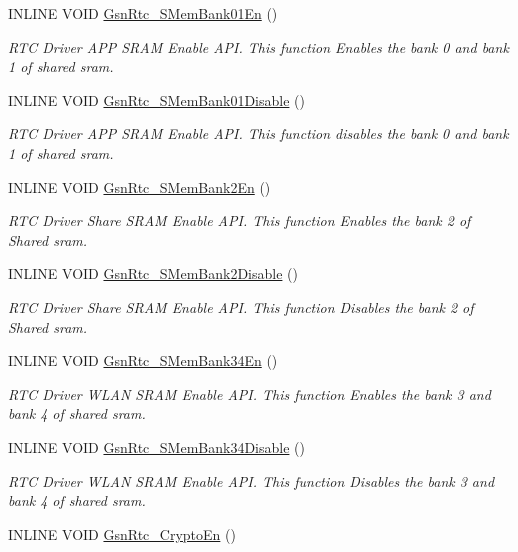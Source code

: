 \begin{DoxyCompactItemize}
\item 
INLINE VOID \hyperlink{a00651_ga6b4bcb149ee20725f2fc899a65d7fdf9}{GsnRtc\_\-SMemBank01En} ()
\begin{DoxyCompactList}\small\item\em RTC Driver APP SRAM Enable API. This function Enables the bank 0 and bank 1 of shared sram. \end{DoxyCompactList}\item 
INLINE VOID \hyperlink{a00651_ga7adb0e944f2c0f0dfffddd0afca63382}{GsnRtc\_\-SMemBank01Disable} ()
\begin{DoxyCompactList}\small\item\em RTC Driver APP SRAM Enable API. This function disables the bank 0 and bank 1 of shared sram. \end{DoxyCompactList}\item 
INLINE VOID \hyperlink{a00651_ga7540c91773261a93185b2bef4969277a}{GsnRtc\_\-SMemBank2En} ()
\begin{DoxyCompactList}\small\item\em RTC Driver Share SRAM Enable API. This function Enables the bank 2 of Shared sram. \end{DoxyCompactList}\item 
INLINE VOID \hyperlink{a00651_gae72a40c37c187ab506437b3592a59cf2}{GsnRtc\_\-SMemBank2Disable} ()
\begin{DoxyCompactList}\small\item\em RTC Driver Share SRAM Enable API. This function Disables the bank 2 of Shared sram. \end{DoxyCompactList}\item 
INLINE VOID \hyperlink{a00651_ga7b62ca77d978a7abc09284be65ea845e}{GsnRtc\_\-SMemBank34En} ()
\begin{DoxyCompactList}\small\item\em RTC Driver WLAN SRAM Enable API. This function Enables the bank 3 and bank 4 of shared sram. \end{DoxyCompactList}\item 
INLINE VOID \hyperlink{a00651_ga0fae00cfd76574f86968b438f6ce9e02}{GsnRtc\_\-SMemBank34Disable} ()
\begin{DoxyCompactList}\small\item\em RTC Driver WLAN SRAM Enable API. This function Disables the bank 3 and bank 4 of shared sram. \end{DoxyCompactList}\item 
INLINE VOID \hyperlink{a00651_ga41ce100b896cbdf73f0a874d673a2c52}{GsnRtc\_\-CryptoEn} ()

\end{DoxyCompactItemize}
